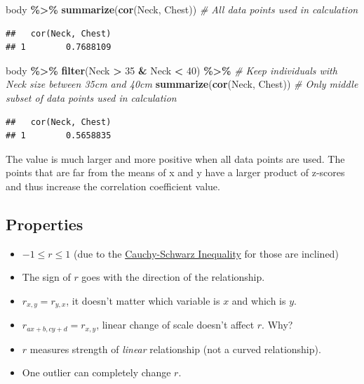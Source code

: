 \documentclass[
]{book}
\newenvironment{Shaded}{\begin{snugshade}}{\end{snugshade}}
\newcommand{\CommentTok}[1]{\textcolor[rgb]{0.56,0.35,0.01}{\textit{#1}}}
\newcommand{\DecValTok}[1]{\textcolor[rgb]{0.00,0.00,0.81}{#1}}
\newcommand{\FunctionTok}[1]{\textcolor[rgb]{0.13,0.29,0.53}{\textbf{#1}}}
\newcommand{\NormalTok}[1]{#1}
\newcommand{\SpecialCharTok}[1]{\textcolor[rgb]{0.81,0.36,0.00}{\textbf{#1}}}
\begin{document}
\begin{Shaded}
\begin{Highlighting}[]
\NormalTok{body }\SpecialCharTok{\%\textgreater{}\%}
  \FunctionTok{summarize}\NormalTok{(}\FunctionTok{cor}\NormalTok{(Neck, Chest)) }\CommentTok{\# All data points used in calculation}
\end{Highlighting}
\end{Shaded}

\begin{verbatim}
##   cor(Neck, Chest)
## 1        0.7688109
\end{verbatim}

\begin{Shaded}
\begin{Highlighting}[]
\NormalTok{body }\SpecialCharTok{\%\textgreater{}\%}
    \FunctionTok{filter}\NormalTok{(Neck }\SpecialCharTok{\textgreater{}} \DecValTok{35} \SpecialCharTok{\&}\NormalTok{ Neck }\SpecialCharTok{\textless{}} \DecValTok{40}\NormalTok{) }\SpecialCharTok{\%\textgreater{}\%} \CommentTok{\# Keep individuals with Neck size between 35cm and 40cm}
      \FunctionTok{summarize}\NormalTok{(}\FunctionTok{cor}\NormalTok{(Neck, Chest)) }\CommentTok{\# Only middle subset of data points used in calculation}
\end{Highlighting}
\end{Shaded}

\begin{verbatim}
##   cor(Neck, Chest)
## 1        0.5658835
\end{verbatim}

The value is much larger and more positive when all data points are used. The points that are far from the means of x and y have a larger product of z-scores and thus increase the correlation coefficient value.

\subsection{Properties}\label{properties}

\begin{itemize}
\item
  \(-1 \leq r \leq 1\) (due to the \href{https://en.wikipedia.org/wiki/Cauchy\%E2\%80\%93Schwarz_inequality}{Cauchy-Schwarz Inequality} for those are inclined)
\item
  The sign of \(r\) goes with the direction of the relationship.
\item
  \(r_{x,y} = r_{y,x}\), it doesn't matter which variable is \(x\) and which is \(y\).
\item
  \(r_{ax+b, cy+d} = r_{x,y}\), linear change of scale doesn't affect \(r\). Why?
\item
  \(r\) measures strength of \emph{linear} relationship (not a curved relationship).
\item
  One outlier can completely change \(r\).
\end{itemize}
\end{document}
